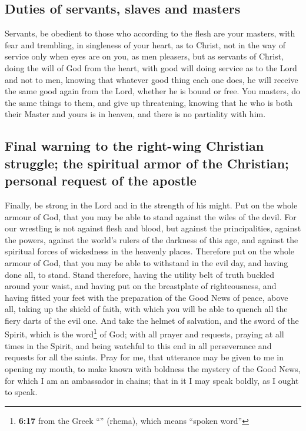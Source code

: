 \hypertarget{duties-of-servants-slaves-and-masters}{%
\subsection{Duties of servants, slaves and
masters}\label{duties-of-servants-slaves-and-masters}}

 Servants, be obedient to those who according to the flesh
are your masters, with fear and trembling, in singleness of your heart,
as to Christ,  not in the way of service only when eyes
are on you, as men pleasers, but as servants of Christ, doing the will
of God from the heart,  with good will doing service as to
the Lord and not to men,  knowing that whatever good thing
each one does, he will receive the same good again from the Lord,
whether he is bound or free.  You masters, do the same
things to them, and give up threatening, knowing that he who is both
their Master and yours is in heaven, and there is no partiality with
him.

\hypertarget{final-warning-to-the-right-wing-christian-struggle-the-spiritual-armor-of-the-christian-personal-request-of-the-apostle}{%
\subsection{Final warning to the right-wing Christian struggle; the
spiritual armor of the Christian; personal request of the
apostle}\label{final-warning-to-the-right-wing-christian-struggle-the-spiritual-armor-of-the-christian-personal-request-of-the-apostle}}

 Finally, be strong in the Lord and in the strength of
his might.  Put on the whole armour of God, that you may
be able to stand against the wiles of the devil.  For our
wrestling is not against flesh and blood, but against the
principalities, against the powers, against the world's rulers of the
darkness of this age, and against the spiritual forces of wickedness in
the heavenly places.  Therefore put on the whole armour
of God, that you may be able to withstand in the evil day, and having
done all, to stand.  Stand therefore, having the utility
belt of truth buckled around your waist, and having put on the
breastplate of righteousness,  and having fitted your
feet with the preparation of the Good News of peace, 
above all, taking up the shield of faith, with which you will be able to
quench all the fiery darts of the evil one.  And take the
helmet of salvation, and the sword of the Spirit, which is the
word\footnote{\textbf{6:17} from the Greek ``'' (rhema),
  which means ``spoken word''} of God;  with all prayer
and requests, praying at all times in the Spirit, and being watchful to
this end in all perseverance and requests for all the saints.
 Pray for me, that utterance may be given to me in
opening my mouth, to make known with boldness the mystery of the Good
News,  for which I am an ambassador in chains; that in it
I may speak boldly, as I ought to speak.


